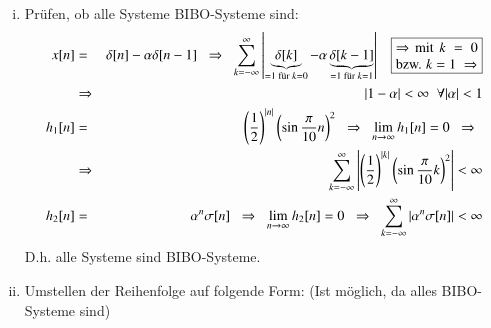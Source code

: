 \begin{uebsp}
\begin{Answer}
\begin{uebsp_theory}
\begin{center}
\begin{tikzpicture}
        \end{tikzpicture}
        \end{center}
    \end{uebsp_theory}
    \begin{enumerate}[i)]
        \item Prüfen, ob alle Systeme BIBO-Systeme sind:
            \begin{eqnarray*}x[n] &=& \delta[n] - \alpha \delta[n - 1]\;\;\Rightarrow\;\;
                \sum_{k=-\infty}^\infty\left|\underbrace{\delta[k]}_{=1\text{ für }k=0} - \alpha \underbrace{\delta[k - 1]}_{=1\text{ für }k=1}\right|\;\;\;\fbox{\begin{minipage}{0.17\textwidth}$\Rightarrow$ mit $k=0$ bzw. $k=1\;\Rightarrow$ \end{minipage}}\\
                 &\Rightarrow& \left|1-\alpha\right|<\infty\;\;\forall|\alpha|<1\\
            h_1[n]&=&\left(\frac{1}{2}\right)^{|n|}\left(\sin\frac{\pi}{10}n\right)^2\;\;\Rightarrow\;\;
                \lim_{n\rightarrow\infty}h_1[n]=0\;\;\Rightarrow\;\;\\
                &\Rightarrow&\sum_{k=-\infty}^\infty\left|\left(\frac{1}{2}\right)^{|k|}\left(\sin\frac{\pi}{10}k\right)^2\right|<\infty\\
            h_2[n]&=&\alpha^n\sigma[n]\;\;\Rightarrow\;\;
                \lim_{n\rightarrow\infty}h_2[n]=0\;\;\Rightarrow\;\;
                \sum_{k=-\infty}^\infty\left|\alpha^n\sigma[n]\right|<\infty
            \end{eqnarray*}
        D.h. alle Systeme sind BIBO-Systeme.
        \item Umstellen der Reihenfolge auf folgende Form: (Ist möglich, da alles BIBO-Systeme sind)
            \begin{center}
\end{center}
\end{enumerate}
\end{Answer}
\end{uebsp}
